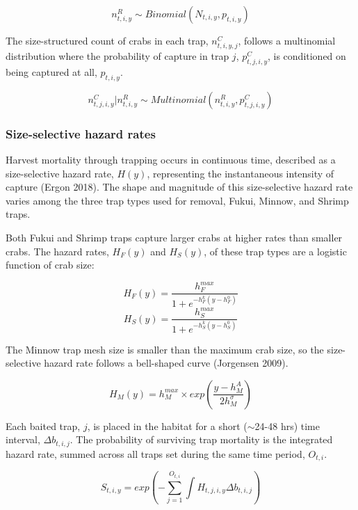 \documentclass{article}
\begin{document}
\begin{equation}
n^R_{t,i,y} \sim Binomial(N_{t,i,y}, p_{t,i,y})
\end{equation}

The size-structured count of crabs in each trap, $n^C_{t,i,y,j}$, follows a multinomial distribution where the probability of capture in trap $j$, $p^C_{t,j,i,y}$, is conditioned on being captured at all, $p_{t,i,y}$.  

\begin{equation}
n^C_{t,j,i,y} | n^R_{t,i,y} \sim Multinomial(n^R_{t,i,y}, p^C_{t,j,i,y})
\end{equation}

\subsubsection*{Size-selective hazard rates}

Harvest mortality through trapping occurs in continuous time, described as a size-selective hazard rate, $H(y)$, representing the instantaneous intensity of capture (Ergon 2018). The shape and magnitude of this size-selective hazard rate varies among the three trap types used for removal, Fukui, Minnow, and Shrimp traps.

Both Fukui and Shrimp traps capture larger crabs at higher rates than smaller crabs. The hazard rates, $H_F(y)$ and $H_S(y)$, of these trap types are a logistic function of crab size:

\begin{equation}
H_F(y) = \frac{h^{max}_F}{1+e^{-h^k_F(y-h^0_F)}}
\end{equation}
\begin{equation}
H_S(y) = \frac{h^{max}_S}{1+e^{-h^k_S(y-h^0_S)}}
\end{equation}

The Minnow trap mesh size is smaller than the maximum crab size, so the size-selective hazard rate follows a bell-shaped curve (Jorgensen 2009).

\begin{equation}
H_M(y) = h^{max}_M \times exp(\frac{y-h^{A}_M}{2 h^{\sigma}_M})
\end{equation}

Each baited trap, $j$, is placed in the habitat for a short ($\sim$24-48 hrs) time interval, $\Delta b_{t,i,j}$. The probability of surviving trap mortality is the integrated hazard rate, summed across all traps set during the same time period, $O_{t,i}$.

\begin{equation}
S_{t,i,y} = exp(-\sum_{j=1}^{O_{t,i}}\int H_{t,j,i,y}\Delta b_{t,i,j})
\end{equation}
\end{document}
